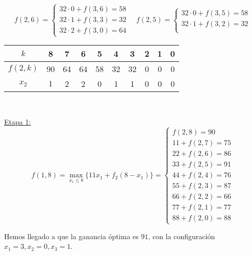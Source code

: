 \documentclass[twoside]{article}
\begin{document}
\begin{ejercicio}{2}
\begin{solucion}
$$f(2,6)=\begin{cases}
32\cdot 0+f(3,6)=58\\
32\cdot 1+f(3,3)=32\\
32\cdot 2+f(3,0)=64
\end{cases}\quad f(2,5)=\begin{cases}
32\cdot 0+f(3,5)=58\\
32\cdot 1+f(3,2)=32\\
\end{cases}$$
\begin{center}
\begin{tabular}{c| c c c c c c c c c}
$k$ & 8 & 7 & 6 & 5 & 4 & 3 & 2 & 1 & 0\\
\hline
$f(2,k)$	& 90 	& 64 	& 64	& 58& 32 & 32 & 0 & 0 & 0\\
$x_2$ 	& $1$ 	& 2 	& 2	& 0&  1 & 1 &   0 & 0 & 0
\end{tabular}\
\end{center}
\underline{Etapa 1:}
$$f(1,8)=\max_{x_1\leq 8}\{11x_1+f_2(8-x_1)\}=\begin{cases}
f(2,8)=90\\
11+f(2,7)=75\\
22+f(2,6)=86\\
33+f(2,5)=\boxed{91}\\
44+f(2,4)=76\\
55+f(2,3)=87\\
66+f(2,2)=66\\
77+f(2,1)=77\\
88+f(2,0)=88
\end{cases}$$

Hemos llegado a que la ganancia óptima es $91$, con la configuración $x_1=3,x_2=0, x_3=1$.
\end{solucion}

\end{ejercicio}
\end{document}
